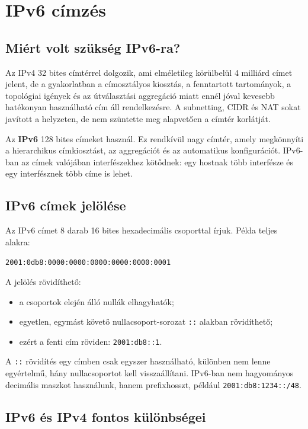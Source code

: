 \section{IPv6 címzés}

\subsection{Miért volt szükség IPv6-ra?}

Az IPv4 32 bites címtérrel dolgozik, ami elméletileg körülbelül 4 milliárd címet jelent, de a gyakorlatban a címosztályos kiosztás, a fenntartott tartományok, a topológiai igények és az útválasztási aggregáció miatt ennél jóval kevesebb hatékonyan használható cím áll rendelkezésre. A subnetting, CIDR és NAT sokat javított a helyzeten, de nem szüntette meg alapvetően a címtér korlátját.

Az \textbf{IPv6} 128 bites címeket használ. Ez rendkívül nagy címtér, amely megkönnyíti a hierarchikus címkiosztást, az aggregációt és az automatikus konfigurációt. IPv6-ban az címek valójában interfészekhez kötődnek: egy hostnak több interfésze és egy interfésznek több címe is lehet.

\subsection{IPv6 címek jelölése}

Az IPv6 címet 8 darab 16 bites hexadecimális csoporttal írjuk. Példa teljes alakra:

\begin{center}
\texttt{2001:0db8:0000:0000:0000:0000:0000:0001}
\end{center}

A jelölés rövidíthető:

\begin{itemize}
  \item a csoportok elején álló nullák elhagyhatók;
  \item egyetlen, egymást követő nullacsoport-sorozat \texttt{::} alakban rövidíthető;
  \item ezért a fenti cím röviden: \texttt{2001:db8::1}.
\end{itemize}

A \texttt{::} rövidítés egy címben csak egyszer használható, különben nem lenne egyértelmű, hány nullacsoportot kell visszaállítani. IPv6-ban nem hagyományos decimális maszkot használunk, hanem prefixhosszt, például \texttt{2001:db8:1234::/48}.

\subsection{IPv6 és IPv4 fontos különbségei}

